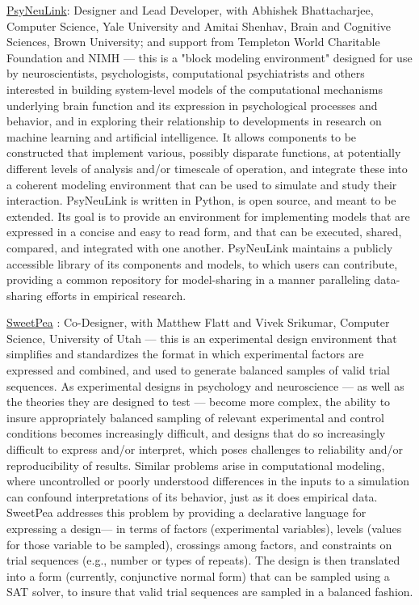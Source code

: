 \documentclass[10 pt]{article}
\begin{document}
\href{http://psyneulink.org}{PsyNeuLink}: Designer and Lead Developer, with Abhishek Bhattacharjee, Computer Science, Yale University and Amitai Shenhav, Brain and Cognitive Sciences, Brown University; and support from Templeton World Charitable Foundation and NIMH — this is a "block modeling environment" designed for use by neuroscientists, psychologists, computational psychiatrists and others interested in building system-level models of the computational mechanisms underlying brain function and its expression in psychological processes and behavior, and in exploring their relationship to developments in research on machine learning and artificial intelligence. It allows components to be constructed that implement various, possibly disparate functions, at potentially different levels of analysis and/or timescale of operation, and integrate these into a coherent modeling environment that can be used to simulate and study their interaction. PsyNeuLink is written in Python, is open source, and meant to be extended. Its goal is to provide an environment for implementing models that are expressed in a concise and easy to read form, and that can be executed, shared, compared, and integrated with one another. PsyNeuLink maintains a publicly accessible library of its components and models, to which users can contribute, providing a common repository for model-sharing in a manner paralleling data-sharing efforts in empirical research.
    \smallskip

\href{https://sites.google.com/view/sweetpea-ai/}{SweetPea} \cite{musslick2022sweetpea}: Co-Designer, with Matthew Flatt and Vivek Srikumar, Computer Science, University of Utah — this is an experimental design environment that simplifies and standardizes the format in which experimental factors are expressed and combined, and used to generate balanced samples of valid trial sequences. As experimental designs in psychology and neuroscience — as well as the theories they are designed to test — become more complex, the ability to insure appropriately balanced sampling of relevant experimental and control conditions becomes increasingly difficult, and designs that do so increasingly difficult to express and/or interpret, which poses challenges to reliability and/or reproducibility of results. Similar problems arise in computational modeling, where uncontrolled or poorly understood differences in the inputs to a simulation can confound interpretations of its behavior, just as it does empirical data. SweetPea addresses this problem by providing a declarative language for expressing a design— in terms of factors (experimental variables), levels (values for those variable to be sampled), crossings among factors, and constraints on trial sequences (e.g., number or types of repeats). The design is then translated into a form (currently, conjunctive normal form) that can be sampled using a SAT solver, to insure that valid trial sequences are sampled in a balanced fashion.
    \smallskip
\end{document}
